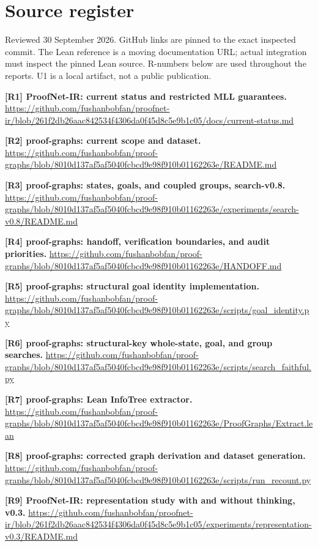 \documentclass[
  10pt,
]{article}
\begin{document}
\section{Source register}\label{source-register}

Reviewed 30 September 2026. GitHub links are pinned to the exact
inspected commit. The Lean reference is a moving documentation URL;
actual integration must inspect the pinned Lean source. R-numbers below
are used throughout the reports. U1 is a local artifact, not a public
publication.

\textbf{{[}R1{]} ProofNet-IR: current status and restricted MLL
guarantees.}
\url{https://github.com/fushanbobfan/proofnet-ir/blob/261f2db26aac842534f4306da0f45d8c5e9b1c05/docs/current-status.md}

\textbf{{[}R2{]} proof-graphs: current scope and dataset.}
\url{https://github.com/fushanbobfan/proof-graphs/blob/8010d137af5af5040fcbcd9e98f910b01162263e/README.md}

\textbf{{[}R3{]} proof-graphs: states, goals, and coupled groups,
search-v0.8.}
\url{https://github.com/fushanbobfan/proof-graphs/blob/8010d137af5af5040fcbcd9e98f910b01162263e/experiments/search-v0.8/README.md}

\textbf{{[}R4{]} proof-graphs: handoff, verification boundaries, and
audit priorities.}
\url{https://github.com/fushanbobfan/proof-graphs/blob/8010d137af5af5040fcbcd9e98f910b01162263e/HANDOFF.md}

\textbf{{[}R5{]} proof-graphs: structural goal identity implementation.}
\url{https://github.com/fushanbobfan/proof-graphs/blob/8010d137af5af5040fcbcd9e98f910b01162263e/scripts/goal_identity.py}

\textbf{{[}R6{]} proof-graphs: structural-key whole-state, goal, and
group searches.}
\url{https://github.com/fushanbobfan/proof-graphs/blob/8010d137af5af5040fcbcd9e98f910b01162263e/scripts/search_faithful.py}

\textbf{{[}R7{]} proof-graphs: Lean InfoTree extractor.}
\url{https://github.com/fushanbobfan/proof-graphs/blob/8010d137af5af5040fcbcd9e98f910b01162263e/ProofGraphs/Extract.lean}

\textbf{{[}R8{]} proof-graphs: corrected graph derivation and dataset
generation.}
\url{https://github.com/fushanbobfan/proof-graphs/blob/8010d137af5af5040fcbcd9e98f910b01162263e/scripts/run_recount.py}

\textbf{{[}R9{]} ProofNet-IR: representation study with and without
thinking, v0.3.}
\url{https://github.com/fushanbobfan/proofnet-ir/blob/261f2db26aac842534f4306da0f45d8c5e9b1c05/experiments/representation-v0.3/README.md}
\end{document}
